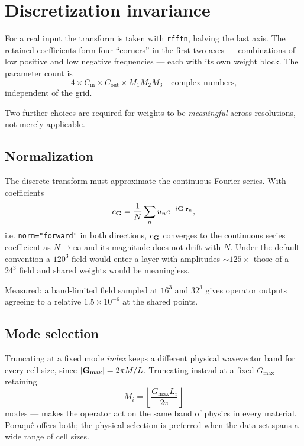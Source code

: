 \section{Discretization invariance}
\label{sec:discinv}

For a real input the transform is taken with \texttt{rfftn}, halving the last
axis. The retained coefficients form four ``corners'' in the first two axes
--- combinations of low positive and low negative frequencies --- each with its
own weight block. The parameter count is
\begin{equation}
  4 \times C_{\mathrm{in}} \times C_{\mathrm{out}} \times M_1 M_2 M_3
  \quad\text{complex numbers,}
\end{equation}
independent of the grid.

Two further choices are required for weights to be \emph{meaningful} across
resolutions, not merely applicable.

\subsection{Normalization}

The discrete transform must approximate the continuous Fourier series. With
coefficients
\begin{equation}
  c_{\mathbf{G}} = \frac{1}{N}\sum_{n} u_n e^{-i\mathbf{G}\cdot\mathbf{r}_n},
\end{equation}
i.e. \texttt{norm="forward"} in both directions, $c_{\mathbf{G}}$ converges to the
continuous series coefficient as $N\to\infty$ and its magnitude does not drift
with $N$. Under the default convention a $120^3$ field would enter a layer with
amplitudes $\sim125\times$ those of a $24^3$ field and shared weights would be
meaningless.

\begin{ptip}
Measured: a band-limited field sampled at $16^3$ and $32^3$ gives operator
outputs agreeing to a relative $1.5\times10^{-6}$ at the shared points.
\end{ptip}

\subsection{Mode selection}

Truncating at a fixed mode \emph{index} keeps a different physical wavevector
band for every cell size, since $|\mathbf{G}_{\max}| = 2\pi M/L$. Truncating instead
at a fixed $G_{\max}$ --- retaining
\begin{equation}
  M_i = \left\lfloor \frac{G_{\max} L_i}{2\pi} \right\rfloor
\end{equation}
modes --- makes the operator act on the same band of physics in every material.
Poraqu\^e offers both; the physical selection is preferred when the data set
spans a wide range of cell sizes.

